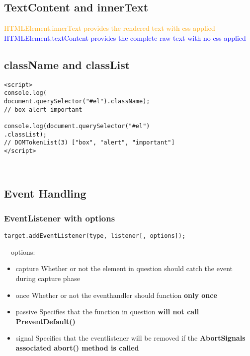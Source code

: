 \documentclass[main.tex,fontsize=6pt,paper=a4,paper=landscape,DIV=calc,]{scrartcl}
\begin{document}
\begin{multicols*}{4}
\subsection{TextContent and innerText}  
\textcolor{orange}{HTMLElement.innerText provides the rendered text with css applied}\newline
\textcolor{blue}{HTMLElement.textContent provides the complete raw text with no css applied}
 
\subsection{className and classList}  
\begin{lstlisting}
<script>
console.log(
document.querySelector("#el").className);
// box alert important

console.log(document.querySelector("#el")
.classList);
// DOMTokenList(3) ["box", "alert", "important"]
</script>
\end{lstlisting}
\, \newline


\subsection{Event Handling}

\subsubsection{EventListener with options}  
\begin{lstlisting}
target.addEventListener(type, listener[, options]);
\end{lstlisting}
\, \newline
\, \newline
options:\newline
\begin{itemize}
  \item capture \newline
    Whether or not the element in question should catch the event during capture phase
  \item once \newline
    Whether or not the eventhandler should function \textbf{only once}
  \item passive \newline
    Specifies that the function in question \textbf{will not call PreventDefault()}
  \item signal \newline 
    Specifies that the eventlistener will be removed if the \textbf{AbortSignals associated abort() method is called}
  

\end{itemize}
\end{multicols*}
\end{document}
